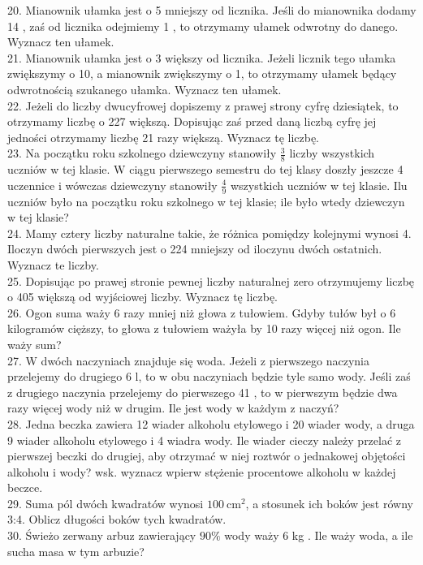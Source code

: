 \documentclass[10pt]{article}
\begin{document}
20. Mianownik ułamka jest o 5 mniejszy od licznika. Jeśli do mianownika dodamy 14 , zaś od licznika odejmiemy 1 , to otrzymamy ułamek odwrotny do danego. Wyznacz ten ułamek.\\
21. Mianownik ułamka jest o 3 większy od licznika. Jeżeli licznik tego ułamka zwiększymy o 10, a mianownik zwiększymy o 1, to otrzymamy ułamek będący odwrotnością szukanego ułamka. Wyznacz ten ułamek.\\
22. Jeżeli do liczby dwucyfrowej dopiszemy z prawej strony cyfrę dziesiątek, to otrzymamy liczbę o 227 większą. Dopisując zaś przed daną liczbą cyfrę jej jedności otrzymamy liczbę 21 razy większą. Wyznacz tę liczbę.\\
23. Na początku roku szkolnego dziewczyny stanowiły \(\frac{3}{8}\) liczby wszystkich uczniów w tej klasie. W ciągu pierwszego semestru do tej klasy doszły jeszcze 4 uczennice i wówczas dziewczyny stanowiły \(\frac{4}{9}\) wszystkich uczniów w tej klasie. Ilu uczniów było na początku roku szkolnego w tej klasie; ile było wtedy dziewczyn w tej klasie?\\
24. Mamy cztery liczby naturalne takie, że różnica pomiędzy kolejnymi wynosi 4. Iloczyn dwóch pierwszych jest o 224 mniejszy od iloczynu dwóch ostatnich. Wyznacz te liczby.\\
25. Dopisując po prawej stronie pewnej liczby naturalnej zero otrzymujemy liczbę o 405 większą od wyjściowej liczby. Wyznacz tę liczbę.\\
26. Ogon suma waży 6 razy mniej niż głowa z tułowiem. Gdyby tułów był o 6 kilogramów cięższy, to głowa z tułowiem ważyła by 10 razy więcej niż ogon. Ile waży sum?\\
27. W dwóch naczyniach znajduje się woda. Jeżeli z pierwszego naczynia przelejemy do drugiego 6 l, to w obu naczyniach będzie tyle samo wody. Jeśli zaś z drugiego naczynia przelejemy do pierwszego 41 , to w pierwszym będzie dwa razy więcej wody niż w drugim. Ile jest wody w każdym z naczyń?\\
28. Jedna beczka zawiera 12 wiader alkoholu etylowego i 20 wiader wody, a druga 9 wiader alkoholu etylowego i 4 wiadra wody. Ile wiader cieczy należy przelać z pierwszej beczki do drugiej, aby otrzymać w niej roztwór o jednakowej objętości alkoholu i wody? wsk. wyznacz wpierw stężenie procentowe alkoholu w każdej beczce.\\
29. Suma pól dwóch kwadratów wynosi \(100 \mathrm{~cm}^{2}\), a stosunek ich boków jest równy 3:4. Oblicz długości boków tych kwadratów.\\
30. Świeżo zerwany arbuz zawierający \(90 \%\) wody waży 6 kg . Ile waży woda, a ile sucha masa w tym arbuzie?\\
\end{document}
